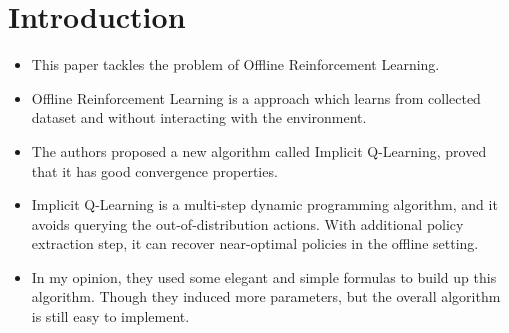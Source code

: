 \section{Introduction}
\label{section:intro}

\begin{itemize}
    \item This paper tackles the problem of Offline Reinforcement Learning.
    \item Offline Reinforcement Learning is a approach which learns from collected dataset and without interacting with the environment.
    \item The authors proposed a new algorithm called Implicit Q-Learning, proved that it has good convergence properties. \cite{2110.06169}
    \item Implicit Q-Learning is a multi-step dynamic programming algorithm, and it avoids querying the out-of-distribution actions. With additional policy extraction step, it can recover near-optimal policies in the offline setting. 
    \item In my opinion, they used some elegant and simple formulas to build up this algorithm. Though they induced more parameters, but the overall algorithm is still easy to implement.
\end{itemize}